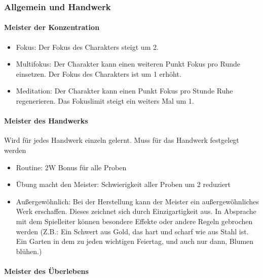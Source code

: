 \documentclass{article}
\begin{document}
\subsubsection{Allgemein und Handwerk}

\paragraph{Meister der Konzentration}

\begin{itemize}
\item Fokus: Der Fokus des Charakters steigt um 2.
\item Multifokus: Der Charakter kann einen weiteren Punkt Fokus pro Runde einsetzen. Der Fokus des Charakters ist um 1 erhöht.
\item Meditation: Der Charakter kann einen Punkt Fokus pro Stunde Ruhe regenerieren. Das Fokuslimit steigt ein weiters Mal um 1.
\end{itemize}

\paragraph{Meister des Handwerks}

Wird für jedes Handwerk einzeln gelernt. Muss für das Handwerk festgelegt werden

\begin{itemize}
\item Routine: 2W Bonus für alle Proben
\item Übung macht den Meister: Schwierigkeit aller Proben um 2 reduziert
\item Außergewöhnlich: Bei der Herstellung kann der Meister ein außergewöhnliches Werk erschaffen. Dieses zeichnet sich durch Einzigartigkeit aus. In Absprache mit dem Spielleiter können besondere Effekte oder andere Regeln gebrochen werden (Z.B.: Ein Schwert aus Gold, das hart und scharf wie aus Stahl ist. Ein Garten in dem zu jeden wichtigen Feiertag, und auch nur dann, Blumen blühen.)
\end{itemize}

\paragraph{Meister des Überlebens}
\end{document}
